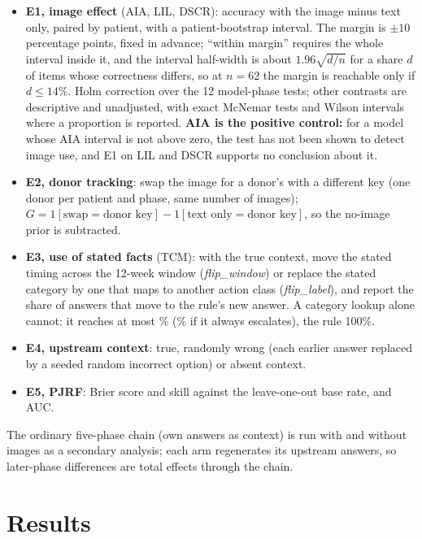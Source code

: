\begin{itemize}[leftmargin=*, itemsep=1pt, topsep=2pt]
    \item \textbf{E1, image effect} (AIA, LIL, DSCR): accuracy with the image minus text only, paired by patient, with a patient-bootstrap interval. The margin is $\pm10$ percentage points, fixed in advance; ``within margin'' requires the whole interval inside it, and the interval half-width is about $1.96\sqrt{d/n}$ for a share $d$ of items whose correctness differs, so at $n=62$ the margin is reachable only if $d\le14\%$. Holm correction over the 12 model-phase tests; other contrasts are descriptive and unadjusted, with exact McNemar tests \citep{mcnemar1947note} and Wilson intervals \citep{wilson1927probable} where a proportion is reported. \textbf{AIA is the positive control:} for a model whose AIA interval is not above zero, the test has not been shown to detect image use, and E1 on LIL and DSCR supports no conclusion about it.
    \item \textbf{E2, donor tracking}: swap the image for a donor's with a different key (one donor per patient and phase, same number of images); $G=1[\text{swap}=\text{donor key}]-1[\text{text only}=\text{donor key}]$, so the no-image prior is subtracted.
    \item \textbf{E3, use of stated facts} (TCM): with the true context, move the stated timing across the 12-week window (\emph{flip\_window}) or replace the stated category by one that maps to another action class (\emph{flip\_label}), and report the share of answers that move to the rule's new answer. A category lookup alone cannot: it reaches at most \vfourTcmLookupConf{}\% (\vfourTcmLookupEsc{}\% if it always escalates), the rule 100\%.
    \item \textbf{E4, upstream context}: true, randomly wrong (each earlier answer replaced by a seeded random incorrect option) or absent context.
    \item \textbf{E5, PJRF}: Brier score and skill against the leave-one-out base rate, and AUC.
\end{itemize}

The ordinary five-phase chain (own answers as context) is run with and without images as a secondary analysis; each arm regenerates its upstream answers, so later-phase differences are total effects through the chain.

\section{Results}
\label{sec:results}

